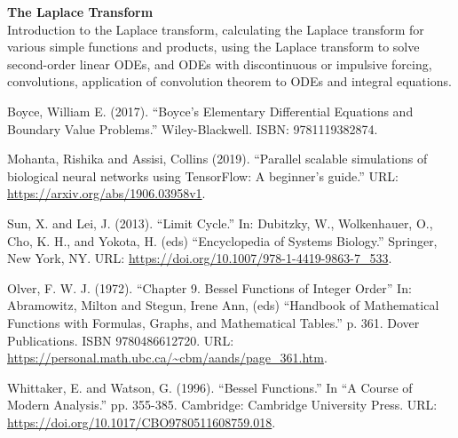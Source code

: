 \documentclass[11pt, a4paper]{article}
\numberwithin{equation}{section}
\numberwithin{figure}{section}
\numberwithin{table}{section}
\newcommand{\vb}[1]{\textbf{#1}}
\begin{document}
{	\vspace{10pt}
	\noindent\vb{The Laplace Transform}\\
	Introduction to the Laplace transform, calculating the Laplace transform for various simple functions and products, using the Laplace transform to solve second-order linear ODEs, and ODEs with discontinuous or impulsive forcing, convolutions, application of convolution theorem to ODEs and integral equations.

}

\pagebreak
\tableofcontents

















\begin{thebibliography}{9}
	Boyce, William E. (2017). ``Boyce's Elementary Differential Equations and Boundary Value Problems.'' Wiley-Blackwell. ISBN: 9781119382874.
	
	Mohanta, Rishika and Assisi, Collins (2019). ``Parallel scalable simulations of biological neural networks using TensorFlow: A beginner's guide.'' URL: \url{https://arxiv.org/abs/1906.03958v1}.
	
	Sun, X. and Lei, J. (2013). ``Limit Cycle.'' In: Dubitzky, W., Wolkenhauer, O., Cho, K. H., and Yokota, H. (eds) ``Encyclopedia of Systems Biology.'' Springer, New York, NY. URL: \url{https://doi.org/10.1007/978-1-4419-9863-7_533}.
	
	Olver, F. W. J. (1972). ``Chapter 9. Bessel Functions of Integer Order'' In: Abramowitz, Milton and Stegun, Irene Ann, (eds) ``Handbook of Mathematical Functions with Formulas, Graphs, and Mathematical Tables.'' p. 361. Dover Publications. ISBN 9780486612720. URL: \url{https://personal.math.ubc.ca/~cbm/aands/page_361.htm}.
	
	Whittaker, E. and Watson, G. (1996). ``Bessel Functions.'' In ``A Course of Modern Analysis.'' pp. 355-385. Cambridge: Cambridge University Press. URL: \url{https://doi.org/10.1017/CBO9780511608759.018}.
\end{thebibliography}
\end{document}
